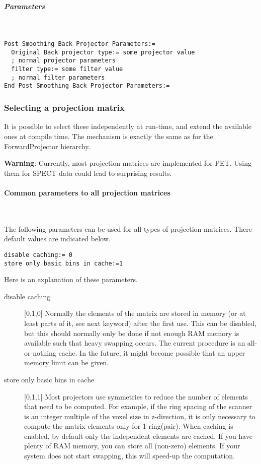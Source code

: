 \documentclass{article}
\newcommand{\subsubsubsection}[1]{\paragraph{#1}\mbox{} \\}
\newcommand{\subsubsubsubsection}[1]{\subparagraph{#1} \mbox{} \\}
\begin{document}
{{ \subsubsubsubsection{Parameters}
}
\begin{verbatim}
Post Smoothing Back Projector Parameters:=
  Original Back projector type:= some projector value 
  ; normal projector parameters
  filter type:= some filter value
  ; normal filter parameters
End Post Smoothing Back Projector Parameters:=
\end{verbatim}


\subsubsection{
Selecting a projection matrix}
\label{sec:projmatrix}
It is possible to select these independently at run-time, and 
extend the available ones at compile time. The mechanism is exactly 
the same as for the ForwardProjector hierarchy.

\textbf{Warning}: Currently, most projection matrices are implemented for PET. Using them for 
SPECT data could lead to surprising results. 

{ \subsubsubsection{Common parameters to all projection matrices}
}
\label{sec:projmatrixcommon}
The following parameters can be used for all types of projection 
matrices. There default values are indicated below.

\begin{verbatim}
disable caching:= 0
store only basic bins in cache:=1
\end{verbatim}

Here is an explanation of these parameters.

\begin{description}
\item[disable caching] [0,1,0{]}
Normally the elements of the matrix are stored in memory (or 
at least parts of it, see next keyword) after the first use. 
This can be disabled, but this should normally only be done if 
not enough RAM memory is available such that heavy swapping occurs. 
The current procedure is an all-or-nothing cache. In the future, 
it might become possible that an upper memory limit can be given.


\item[store only basic bins in cache] [0,1,1{]}
Most projectors use symmetries to reduce the number of elements 
that need to be computed. For example, if the ring spacing of 
the scanner is an integer multiple of the voxel size in z-direction, 
it is only necessary to compute the matrix elements only for 
1 ring(pair). When caching is enabled, by default only the independent 
elements are cached. If you have plenty of RAM memory, you can 
store all (non-zero) elements. If your system does not start 
swapping, this will speed-up the computation.
\end{description}

}
\end{document}

